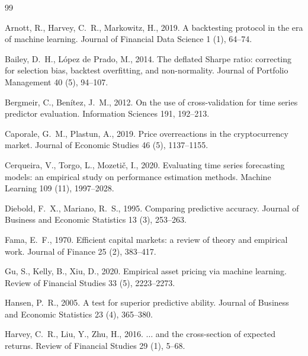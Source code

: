 \documentclass[preprint,12pt,authoryear]{elsarticle}
\begin{document}
\begin{thebibliography}{99}

Arnott, R., Harvey, C.~R., Markowitz, H., 2019.
A backtesting protocol in the era of machine learning.
Journal of Financial Data Science 1 (1), 64--74.

Bailey, D.~H., L\'opez de Prado, M., 2014.
The deflated Sharpe ratio: correcting for selection bias, backtest overfitting,
and non-normality.
Journal of Portfolio Management 40 (5), 94--107.

Bergmeir, C., Ben\'itez, J.~M., 2012.
On the use of cross-validation for time series predictor evaluation.
Information Sciences 191, 192--213.

Caporale, G.~M., Plastun, A., 2019.
Price overreactions in the cryptocurrency market.
Journal of Economic Studies 46 (5), 1137--1155.

Cerqueira, V., Torgo, L., Mozeti\v{c}, I., 2020.
Evaluating time series forecasting models: an empirical study on performance
estimation methods.
Machine Learning 109 (11), 1997--2028.

Diebold, F.~X., Mariano, R.~S., 1995.
Comparing predictive accuracy.
Journal of Business and Economic Statistics 13 (3), 253--263.

Fama, E.~F., 1970.
Efficient capital markets: a review of theory and empirical work.
Journal of Finance 25 (2), 383--417.

Gu, S., Kelly, B., Xiu, D., 2020.
Empirical asset pricing via machine learning.
Review of Financial Studies 33 (5), 2223--2273.

Hansen, P.~R., 2005.
A test for superior predictive ability.
Journal of Business and Economic Statistics 23 (4), 365--380.

Harvey, C.~R., Liu, Y., Zhu, H., 2016.
$\dots$ and the cross-section of expected returns.
Review of Financial Studies 29 (1), 5--68.


\end{thebibliography}
\end{document}
